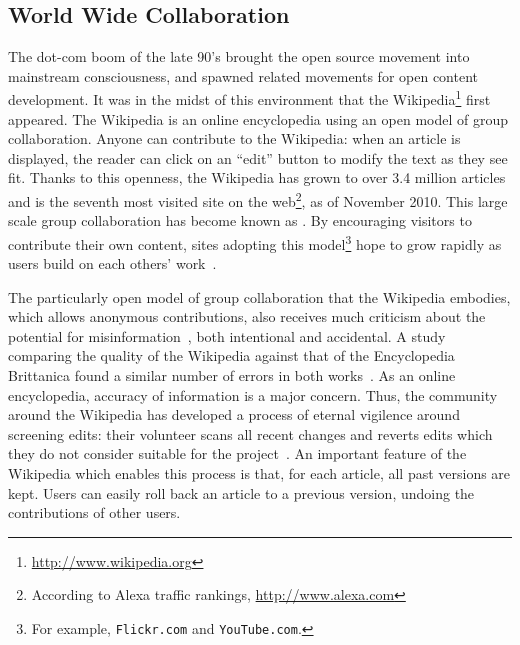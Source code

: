 \subsection{World Wide Collaboration}

The dot-com boom of the late 90's brought the open source movement into
mainstream consciousness, and spawned related movements for open
content development.
It was in the midst of this environment that the
Wikipedia\footnote{\url{http://www.wikipedia.org}}
first appeared.
The Wikipedia
is an online encyclopedia using an open model of group collaboration.
Anyone can contribute to the Wikipedia: when an article is
displayed, the reader can click on an ``edit'' button to modify
the text as they see fit.
Thanks to this openness, the Wikipedia has grown to
over 3.4 million articles and is the seventh most visited site on the
web\footnote{According to Alexa traffic rankings, \url{http://www.alexa.com}},
as of November 2010.
This large scale group collaboration
has become known as .
By encouraging visitors to contribute their own content,
sites adopting this model\footnote{For example,
\texttt{Flickr.com} and \texttt{YouTube.com}.}
hope to grow rapidly as users build on each others' work~\cite{Taylor2007}.



The particularly open model of group collaboration that the Wikipedia embodies,
which allows anonymous contributions,
also receives much criticism about the potential for
misinformation~\cite{Seigenthaler05,Stross2006,NewYorkTimes05a,TheSun06,NewZelandHerald06,BBC06,NewYorkTimes06,TheNewYorker06,BBC07},
both intentional and accidental.
A study comparing the quality of the Wikipedia against that
of the Encyclopedia Brittanica found a similar number of
errors  in both works~\cite{Giles2005}.
As an online encyclopedia, accuracy of information is a major concern.
Thus, the community around the Wikipedia has developed a process
of eternal vigilence around screening edits: their volunteer  scans
all recent changes and reverts edits which they do not consider
suitable for the project~\cite{wiki:RCPatrol}.
An important feature of the Wikipedia which enables this
process is that, for each article,
all past versions are kept.
Users can easily roll back an article to a previous version,
undoing the contributions of other users.


